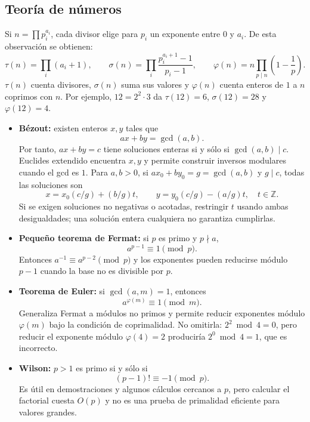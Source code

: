 \subsection{Teor\'ia de n\'umeros}
Si $n=\prod p_i^{a_i}$, cada divisor elige para $p_i$ un exponente entre $0$ y
$a_i$. De esta observaci\'on se obtienen:
\[
    \tau(n)=\prod_i(a_i+1),\qquad
    \sigma(n)=\prod_i\frac{p_i^{a_i+1}-1}{p_i-1},\qquad
    \varphi(n)=n\prod_{p\mid n}\left(1-\frac1p\right).
\]
$\tau(n)$ cuenta divisores, $\sigma(n)$ suma sus valores y $\varphi(n)$ cuenta
enteros de $1$ a $n$ coprimos con $n$. Por ejemplo,
$12=2^2\cdot3$ da $\tau(12)=6$, $\sigma(12)=28$ y $\varphi(12)=4$.
\begin{itemize}
  \item \textbf{B\'ezout:} existen enteros $x,y$ tales que
  \[
      ax+by=\gcd(a,b).
  \]
  Por tanto, $ax+by=c$ tiene soluciones enteras si y s\'olo si
  $\gcd(a,b)\mid c$. Euclides extendido encuentra $x,y$ y permite construir
  inversos modulares cuando el gcd es $1$. Para $a,b>0$, si
  $ax_0+by_0=g=\gcd(a,b)$ y $g\mid c$, todas las soluciones son
  \[
  x=x_0(c/g)+(b/g)t,\qquad y=y_0(c/g)-(a/g)t,\quad t\in\mathbb Z.
  \]
  Si se exigen soluciones no negativas o acotadas, restringir $t$ usando ambas
  desigualdades; una soluci\'on entera cualquiera no garantiza cumplirlas.
  \item \textbf{Peque\~no teorema de Fermat:} si $p$ es primo y $p\nmid a$,
  \[
      a^{p-1}\equiv1\pmod p.
  \]
  Entonces $a^{-1}\equiv a^{p-2}\pmod p$ y los exponentes pueden reducirse
  m\'odulo $p-1$ cuando la base no es divisible por $p$.
  \item \textbf{Teorema de Euler:} si $\gcd(a,m)=1$, entonces
  \[
      a^{\varphi(m)}\equiv1\pmod m.
  \]
  Generaliza Fermat a m\'odulos no primos y permite reducir exponentes m\'odulo
  $\varphi(m)$ bajo la condici\'on de coprimalidad. No omitirla:
  $2^2\bmod4=0$, pero reducir el exponente m\'odulo $\varphi(4)=2$ producir\'ia
  $2^0\bmod4=1$, que es incorrecto.
  \item \textbf{Wilson:} $p>1$ es primo si y s\'olo si
  \[
      (p-1)!\equiv-1\pmod p.
  \]
  Es \'util en demostraciones y algunos c\'alculos cercanos a $p$, pero calcular
  el factorial cuesta $O(p)$ y no es una prueba de primalidad eficiente para
  valores grandes.
\end{itemize}

